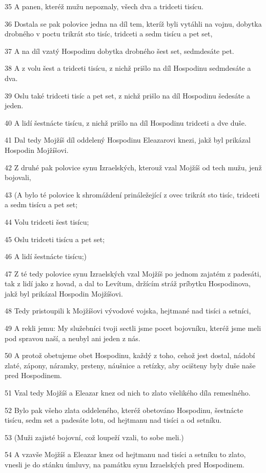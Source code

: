 \par 35 A panen, kteréž mužu nepoznaly, všech dva a tridceti tisícu.
\par 36 Dostala se pak polovice jedna na díl tem, kteríž byli vytáhli na vojnu, dobytka drobného v poctu trikrát sto tisíc, tridceti a sedm tisícu a pet set,
\par 37 A na díl vzatý Hospodinu dobytka drobného šest set, sedmdesáte pet.
\par 38 A z volu šest a tridceti tisícu, z nichž prišlo na díl Hospodinu sedmdesáte a dva.
\par 39 Oslu také tridceti tisíc a pet set, z nichž prišlo na díl Hospodinu šedesáte a jeden.
\par 40 A lidí šestnácte tisícu, z nichž prišlo na díl Hospodinu tridceti a dve duše.
\par 41 Dal tedy Mojžíš díl oddelený Hospodinu Eleazarovi knezi, jakž byl prikázal Hospodin Mojžíšovi.
\par 42 Z druhé pak polovice synu Izraelských, kterouž vzal Mojžíš od tech mužu, jenž bojovali,
\par 43 (A bylo té polovice k shromáždení prináležející z ovec trikrát sto tisíc, tridceti a sedm tisícu a pet set;
\par 44 Volu tridceti šest tisícu;
\par 45 Oslu tridceti tisícu a pet set;
\par 46 A lidí šestnácte tisícu;)
\par 47 Z té tedy polovice synu Izraelských vzal Mojžíš po jednom zajatém z padesáti, tak z lidí jako z hovad, a dal to Levítum, držícím stráž príbytku Hospodinova, jakž byl prikázal Hospodin Mojžíšovi.
\par 48 Tedy pristoupili k Mojžíšovi vývodové vojska, hejtmané nad tisíci a setníci,
\par 49 A rekli jemu: My služebníci tvoji sectli jsme pocet bojovníku, kteréž jsme meli pod spravou naší, a neubyl ani jeden z nás.
\par 50 A protož obetujeme obet Hospodinu, každý z toho, cehož jest dostal, nádobí zlaté, zápony, náramky, prsteny, náušnice a retízky, aby ocišteny byly duše naše pred Hospodinem.
\par 51 Vzal tedy Mojžíš a Eleazar knez od nich to zlato všelikého díla remeslného.
\par 52 Bylo pak všeho zlata oddeleného, kteréž obetováno Hospodinu, šestnácte tisícu, sedm set a padesáte lotu, od hejtmanu nad tisíci a od setníku.
\par 53 (Muži zajisté bojovní, což loupeží vzali, to sobe meli.)
\par 54 A vzavše Mojžíš a Eleazar knez od hejtmanu nad tisíci a setníku to zlato, vnesli je do stánku úmluvy, na památku synu Izraelských pred Hospodinem.

